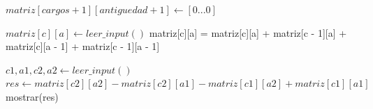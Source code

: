 \begin{algorithmic}

	\State $matriz[cargos + 1][antiguedad + 1] \gets [0...0]$ 

			\State $matriz[c][a] \gets leer\_input()$
			\State matriz[c][a] = matriz[c][a] + matriz[c - 1][a] + matriz[c][a - 1] + matriz[c - 1][a - 1]
		\EndFor
	\EndFor

		\State $c1, a1, c2, a2 \gets leer\_input()$
		\State $res \gets matriz[c2][a2] - matriz[c2][a1] - matriz[c1][a2] + matriz[c1][a1]$
		\State mostrar(res)
	\EndFor

\end{algorithmic}